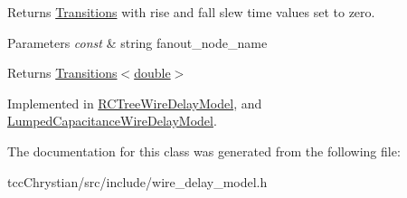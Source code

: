 Returns \hyperlink{classTransitions}{Transitions} with rise and fall slew time values set to zero. 


\begin{DoxyParams}{Parameters}
{\em const} & string fanout\-\_\-node\-\_\-name\\
\hline
\end{DoxyParams}
\begin{DoxyReturn}{Returns}
\hyperlink{classTransitions}{Transitions$<$double$>$} 
\end{DoxyReturn}


Implemented in \hyperlink{classRCTreeWireDelayModel_aea4c7315bdd3715ca0c67707b2c32a8c}{R\-C\-Tree\-Wire\-Delay\-Model}, and \hyperlink{classLumpedCapacitanceWireDelayModel_aaedd69e811e7220e48493c51fb0443ed}{Lumped\-Capacitance\-Wire\-Delay\-Model}.



The documentation for this class was generated from the following file\-:\begin{DoxyCompactItemize}
\item 
tcc\-Chrystian/src/include/wire\-\_\-delay\-\_\-model.\-h\end{DoxyCompactItemize}
